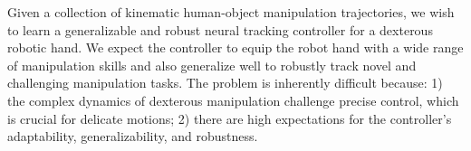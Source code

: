 


Given a collection of kinematic human-object manipulation trajectories, we wish to learn a generalizable and robust neural tracking controller for a dexterous robotic hand. 
We expect the controller to equip the robot hand with a wide range of manipulation skills and also generalize well to robustly track novel and challenging manipulation tasks.
The problem is inherently difficult because: 1) the complex dynamics of dexterous manipulation challenge precise control, which is crucial for delicate motions; 2) there are high expectations for the controller's adaptability, generalizability, and robustness.





